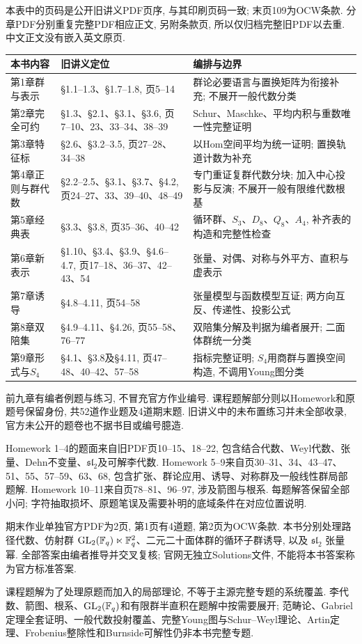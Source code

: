 本表中的页码是公开旧讲义PDF页序, 与其印刷页码一致; 末页109为OCW条款. 分章PDF分别重复完整PDF相应正文, 另附条款页, 所以仅归档完整旧PDF以去重. 中文正文没有嵌入英文原页.
\begin{longtable}{p{} p{} p{}}
\toprule 本书内容&旧讲义定位&编排与边界\\\midrule\endhead
第1章群与表示&§1.1--1.3、§1.7--1.8, 页5--14&群论必要语言与置换矩阵为衔接补充; 不展开一般代数分类\\
第2章完全可约&§1.3、§2.1、§3.1、§3.6, 页7--10、23、33--34、38--39&Schur、Maschke、平均内积与重数唯一性完整证明\\
第3章特征标&§2.6、§3.2--3.5, 页27--28、34--38&以Hom空间平均为统一证明; 置换轨道计数为补充\\
第4章正则与群代数&§2.2--2.5、§3.1、§3.7、§4.2, 页24--27、33、39--40、48--49&专门重证复群代数分块; 加入中心投影与反演; 不展开一般有限维代数根基\\
第5章经典表&§3.3、§3.8, 页35--36、40--42&循环群、$S_3$、$D_8$、$Q_8$、$A_4$, 补齐表的构造和完整性检查\\
第6章新表示&§1.10、§3.4、§3.9、§4.6--4.7, 页17--18、36--37、42--43、54&张量、对偶、对称与外平方、直积与虚表示\\
第7章诱导&§4.8--4.11, 页54--58&张量模型与函数模型互证; 两方向互反、传递性、投影公式\\
第8章双陪集&§4.9--4.11、§4.26, 页55--58、76--77&双陪集分解及判据为编者展开; 二面体群统一分类\\
第9章形式与$S_4$&§4.1、§3.8及§4.11, 页47--48、40--42、57--58&指标完整证明; $S_4$用商群与置换空间构造, 不调用Young图分类\\\bottomrule
\end{longtable}
前九章有编者例题与练习, 不冒充官方作业编号. 课程题解部分则以Homework和原题号保留身份, 共52道作业题及4道期末题. 旧讲义中的未布置练习并未全部收录, 官方未公开的题卷也不据书目或编号臆造.

Homework 1--4的题面来自旧PDF页10--15、18--22, 包含结合代数、Weyl代数、张量、Dehn不变量、$\mathfrak{sl}_2$及可解李代数. Homework 5--9来自页30--31、34、43--47、51、55、57--59、63、68, 包含扩张、群论应用、诱导、对称群及一般线性群局部题解. Homework 10--11来自页78--81、96--97, 涉及箭图与根系. 每题解答保留全部小问; 字符抽取损坏、原题笔误及需要补明的底域条件在对应位置说明.

期末作业单独官方PDF为2页, 第1页有4道题, 第2页为OCW条款. 本书分别处理路径代数、仿射群 $\operatorname{GL}_2(\mathbb F_q)\ltimes\mathbb F_q^2$、二元二十面体群的循环子群诱导, 以及 $\mathfrak{sl}_2$ 张量幂. 全部答案由编者推导并交叉复核; 官网无独立Solutions文件, 不能将本书答案称为官方标准答案.

课程题解为了处理原题而加入的局部理论, 不等于主源完整专题的系统覆盖. 李代数、箭图、根系、$\operatorname{GL}_2(\mathbb F_q)$和有限群半直积在题解中按需要展开; 范畴论、Gabriel定理全套证明、一般代数投射覆盖、完整Young图与Schur--Weyl理论、Artin定理、Frobenius整除性和Burnside可解性仍非本书完整专题.
